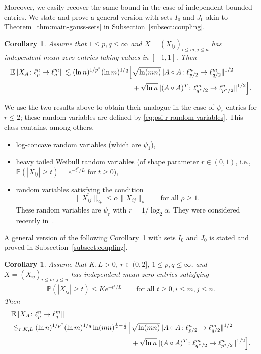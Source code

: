 \documentclass[a4paper]{amsart}
\newtheorem{corollary}[theorem]{Corollary} %
\theoremstyle{definition}
\theoremstyle{remark}
\numberwithin{equation}{section}
\newcommand*{\EE}{\mathbb{E}}
\newcommand*{\PP}{\mathbb{P}}
\newcommand*{\hadprod}{\mathbin{\circ}} %
\begin{document}
Moreover, we easily recover the same bound in the case of independent bounded entries.
We state and prove a general version with sets $I_0$ and $J_0$ akin to Theorem~\ref{thm:main-gauss-sets} in Subsection~\ref{subsect:coupling}.

\begin{corollary}	\label{thm:main-bounded-introduction}
Assume that $1\leq p,q \leq \infty$ and $X=(X_{ij})_{i\leq m, j\leq n}$ has independent mean-zero entries taking values in $[-1,1]$.
Then
	\begin{align*}
		\EE \|X_A \colon \ell^n_p\to \ell^m_q\|
		 \lesssim  (\ln n)^{1/p^*}  (\ln m)^{1/q} \Bigl[ & \sqrt{\ln(mn)} \|A\hadprod A \colon \ell^n_{p/2} \to \ell^m_{q/2}\|^{1/2}\\
 		 &+\sqrt{\ln n}  \|(A\hadprod A)^T \colon \ell^m_{q^*/2} \to \ell^n_{p^*/2}\|^{1/2} \Bigr].
 \end{align*}
 \end{corollary}


We use the two results above to obtain their analogue in the case of $\psi_r$   entries for $r\le 2$;  these random variables are defined by \eqref{eq:psi r random variables}.
This class contains, among others,
\begin{itemize}
	\item  log-concave random variables (which are $\psi_1$),
	\item heavy tailed Weibull random variables (of shape parameter $r\in(0,1)$,
	 i.e., $\PP(|X_{ij}|\ge t)=e^{-t^r/L}$ for $t\geq 0$),
		\item	random variables satisfying the condition
	\[
		\|X_{ij}\|_{2\rho} \le \alpha \|X_{ij}\|_{\rho} \qquad \text{for all } \rho\ge 1.
	\]
	These random variables are $\psi_r$ with $r=1/\log_2\alpha$.
	They were considered recently in~\cite{LatalaStrzeleckaMat}.
	\end{itemize}
A general version of the following Corollary~\ref{thm:main-psi-r-introduction} with sets $I_0$ and $J_0$ is stated and proved in Subsection~\ref{subsect:coupling}.


\begin{corollary}
\label{thm:main-psi-r-introduction}
	Assume that $K,L >0$, $r\in(0,2]$, $1\leq p,q \leq \infty$, and $X=(X_{ij})_{i\leq m, j\leq n}$ has independent mean-zero entries satisfying
	\begin{align}\label{eq:psi r random variables}
	\PP(|X_{ij}|\ge t) \le Ke^{-t^r/L} \qquad \text{for all } t\ge 0, i\leq m, j\leq n.
	\end{align}
	Then
	\begin{align*}
	\MoveEqLeft[17]
	 \EE \|X_A \colon \ell^n_p\to \ell^m_q\| \\
	 \lesssim_{r,K,L}  (\ln n)^{1/p^*}  (\ln m)^{1/q}\ln(mn)^{\frac 1r - \frac12} \Bigl[&  \sqrt{\ln(mn)} \|A\hadprod A \colon \ell^n_{p/2} \to \ell^m_{q/2}\|^{1/2}\\
	&+\sqrt{\ln  n}  \|(A\hadprod A)^T \colon \ell^m_{q^*/2} \to \ell^n_{p^*/2}\|^{1/2} \Bigr].
	\end{align*}
  	 \end{corollary}
\end{document}
